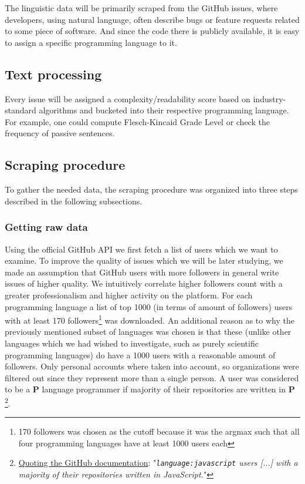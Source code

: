 \documentclass[]{article}
\newcommand{\code}[1]{\texttt{#1}}
\begin{document}
The linguistic data will be primarily scraped from the GitHub issues, where developers, using natural language, often describe bugs or feature requests related to some piece of software. And since the code there is publicly available, it is easy to assign a specific programming language to it.

\subsection{Text processing}

Every issue will be assigned a complexity/readability score based on industry-standard algorithms and bucketed into their respective programming language. For example, one could compute Flesch-Kincaid Grade Level or check the frequency of passive sentences.

\subsection{Scraping procedure} \label{scraping_procedure}

To gather the needed data, the scraping procedure was organized into three steps described in the following subsections.

\subsubsection{Getting raw data}

Using the official GitHub API we first fetch a list of users which we want to examine. To improve the quality of issues which we will be later studying, we made an assumption that GitHub users with more followers in general write issues of higher quality. We intuitively correlate higher followers count with a greater professionalism and higher activity on the platform. For each programming language a list of top 1000 (in terms of amount of followers) users with at least 170 followers\footnote{170 followers was chosen as the cutoff because it was the argmax such that all four programming languages have at least 1000 users each} was downloaded. An additional reason as to why the previously mentioned subset of languages was chosen is that these (unlike other languages which we had wished to investigate, such as purely scientific programming languages) do have a 1000 users with a reasonable amount of followers. Only personal accounts where taken into account, so organizations were filtered out since they represent more than a single person. A user was considered to be a $\mathbf P$ language programmer if majority of their repositories are written in $\mathbf P$\footnote{\href{https://docs.github.com/en/search-github/searching-on-github/searching-users\#search-by-repository-language}{Quoting the GitHub documentation}: "{\it \code{language:javascript} users [...] with a majority of their repositories written in JavaScript.}"}.
\end{document}
